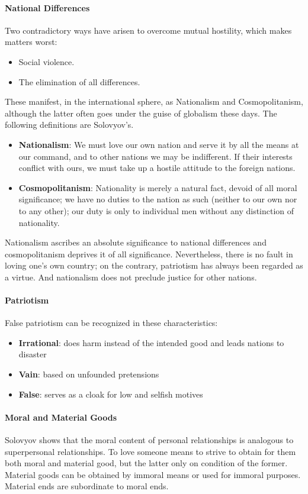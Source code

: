 \paragraph{National Differences}
Two contradictory ways have arisen to overcome mutual hostility, which makes matters worst:

\begin{itemize}
\item Social violence. 
\item The elimination of all differences. 
\end{itemize}
These manifest, in the international sphere, as Nationalism and Cosmopolitanism, although the latter often goes under the guise of globalism these days. The following definitions are Solovyov's.

\begin{itemize}
\item \textbf{Nationalism}: We must love our own nation and serve it by all the means at our command, and to other nations we may be indifferent. If their interests conflict with ours, we must take up a hostile attitude to the foreign nations. 
\item \textbf{Cosmopolitanism}: Nationality is merely a natural fact, devoid of all moral significance; we have no duties to the nation as such (neither to our own nor to any other); our duty is only to individual men without any distinction of nationality. 
\end{itemize}
Nationalism ascribes an absolute significance to national differences and cosmopolitanism deprives it of all significance. Nevertheless, there is no fault in loving one's own country; on the contrary, patriotism has always been regarded as a virtue. And nationalism does not preclude justice for other nations.

\paragraph{Patriotism}
False patriotism can be recognized in these characteristics:

\begin{itemize}
\item \textbf{Irrational}: does harm instead of the intended good and leads nations to disaster 
\item \textbf{Vain}: based on unfounded pretensions 
\item \textbf{False}: serves as a cloak for low and selfish motives 
\end{itemize}
\paragraph{Moral and Material Goods}
Solovyov shows that the moral content of personal relationships is analogous to superpersonal relationships. To love someone means to strive to obtain for them both moral and material good, but the latter only on condition of the former. Material goods can be obtained by immoral means or used for immoral purposes. Material ends are subordinate to moral ends.

